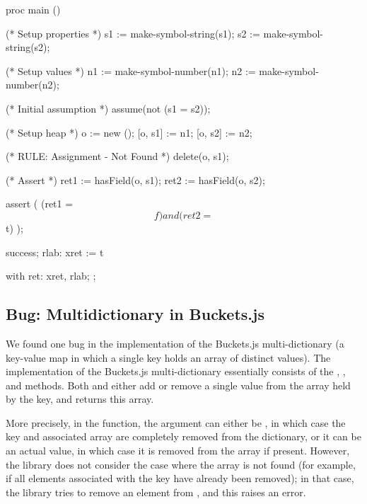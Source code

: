 \begin{lstjs}
proc main () {
    (* Setup properties *)
    s1 := make-symbol-string(s1);
    s2 := make-symbol-string(s2);

    (* Setup values *)
    n1 := make-symbol-number(n1);
    n2 := make-symbol-number(n2);

    (* Initial assumption *)
    assume(not (s1 = s2));

    (* Setup heap *)
    o := new ();
    [o, s1] := n1;
    [o, s2] := n2;

    (* RULE: Assignment - Not Found *)
    delete(o, s1);

    (* Assert *)
    ret1 := hasField(o, s1);
    ret2 := hasField(o, s2);

    assert (
        (ret1 = $$f) and (ret2 = $$t)
    );

    success;
    rlab:   xret := $$t
}
with
{
    ret:    xret, rlab;
};
\end{lstjs}
 
\subsection{Bug: Multidictionary in Buckets.js}
We found one bug in the implementation of the Buckets.js multi-dictionary (a key-value map in which a single key holds an array of distinct values). 
The implementation of the Buckets.js multi-dictionary essentially consists of the , , and  methods.
Both  and  either add or remove a single value from the array held by the key, and  returns this array.

More precisely, in the  function, the  argument can either be , in which case the key and associated array are completely removed from the dictionary, or it can be an actual value, in which case it is removed from the array if present.
However, the library does not consider the case where the array is not found (for example, if all elements associated with the key have already been removed); in that case, the library tries to remove an element from , and this raises an error.

